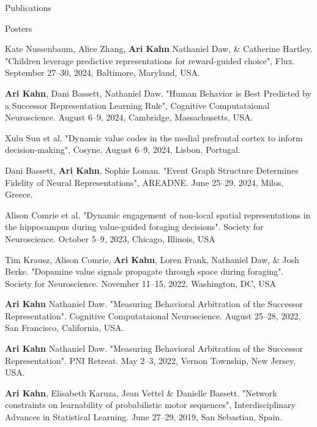 \documentclass{resume} %
\begin{document}
\begin{rSection}{Publications}
\printbibliography[heading=none, notkeyword=preprint]
\end{rSection}

\begin{rSection}{Posters}

Kate Nussenbaum, Alice Zhang, \textbf{Ari Kahn} Nathaniel Daw, \& Catherine Hartley. "Children leverage predictive representations for reward-guided choice", Flux. September 27--30, 2024, Baltimore, Maryland, USA.

\textbf{Ari Kahn}, Dani Bassett, Nathaniel Daw. "Human Behavior is Best Predicted by a Successor Representation Learning Rule", Cognitive Computataional Neuroscience. August 6--9, 2024, Cambridge, Massachusetts, USA.

Xulu Sun et al. "Dynamic value codes in the medial prefrontal cortex to inform decision-making", Cosyne. August 6--9, 2024, Lisbon, Portugal.

Dani Bassett, \textbf{Ari Kahn}, Sophie Loman. "Event Graph Structure Determines Fidelity of Neural Representations", AREADNE. June 25--29, 2024, Milos, Greece.

Alison Comrie et al. "Dynamic engagement of non-local spatial representations in the hippocampus during value-guided foraging decisions". Society for Neuroscience. October 5--9, 2023, Chicago, Illinois, USA

Tim Krausz, Alison Comrie, \textbf{Ari Kahn}, Loren Frank, Nathaniel Daw, \& Josh Berke. "Dopamine value signals propagate through space during foraging". Society for Neuroscience. November 11--15, 2022, Washington, DC, USA

\textbf{Ari Kahn} Nathaniel Daw. "Measuring Behavioral Arbitration of the Successor Representation". Cognitive Computataional Neuroscience. August 25--28, 2022, San Francisco, California, USA.

\textbf{Ari Kahn} Nathaniel Daw. "Measuring Behavioral Arbitration of the Successor Representation". PNI Retreat. May 2--3, 2022, Vernon Township, New Jersey, USA.

\textbf{Ari Kahn}, Elisabeth Karuza, Jean Vettel \& Danielle Bassett. "Network constraints on learnability of probabilistic motor sequences", Interdisciplinary Advances in Statistical Learning. June 27--29, 2019, San Sebastian, Spain.


\end{rSection}
\end{document}
